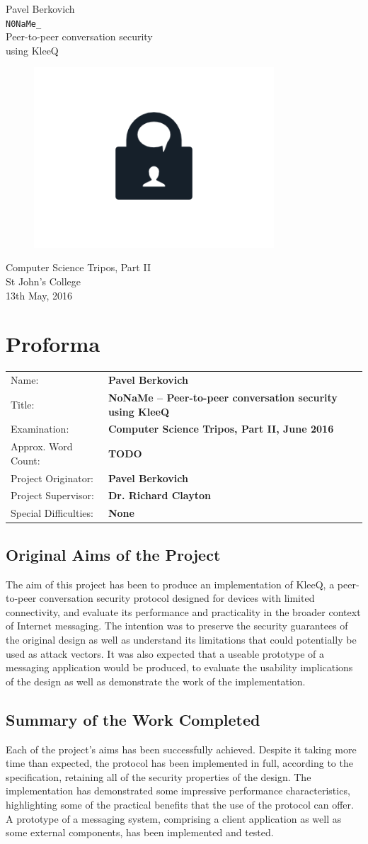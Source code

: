 \documentclass[a4paper, 12pt]{report}
\newcommand*{\titleTH}{ %
\begingroup
\raggedleft
\thispagestyle{empty}
{\Large Pavel Berkovich}\\[0.167\textheight] \centering
{\huge \texttt{N0NaMe\_}}\\[\baselineskip]
{\Large Peer-to-peer conversation security \\ using KleeQ} \\
\begin{figure}[h]
    \centering
    \includegraphics[width = 0.8\textwidth]{lock_chat.png} 
\end{figure}
{\large Computer Science Tripos, Part II}\\ \vspace{3mm}
{\large St John's College} \\ \vspace{3mm}
{\large 13th May, 2016}
\vfill
\clearpage
\endgroup}
\begin{document}
\titleTH


\chapter*{Proforma}
\begin{tabular}{l >{\bfseries}l}
    Name: & Pavel Berkovich \\
    Title: & NoNaMe -- Peer-to-peer conversation security using KleeQ \\
    Examination: & Computer Science Tripos, Part II, June 2016 \\
    Approx. Word Count: & {\color{red} TODO} \\
    Project Originator: & Pavel Berkovich \\
    Project Supervisor: & Dr. Richard Clayton \\
    Special Difficulties: & None
\end{tabular}

\section*{Original Aims of the Project}
The aim of this project has been to produce an implementation of KleeQ, a peer-to-peer conversation security protocol designed for devices with limited connectivity, and evaluate its performance and practicality in the broader context of Internet messaging. The intention was to preserve the security guarantees of the original design as well as understand its limitations that could potentially be used as attack vectors. It was also expected that a useable prototype of a messaging application would be produced, to evaluate the usability implications of the design as well as demonstrate the work of the implementation.

\section*{Summary of the Work Completed}
{\color{red} 
Each of the project's aims has been successfully achieved. Despite it taking more time than expected, the protocol has been implemented in full, according to the specification, retaining all of the security properties of the design. The implementation has demonstrated some impressive performance characteristics, highlighting some of the practical benefits that the use of the protocol can offer. A prototype of a messaging system, comprising a client application as well as some external components, has been implemented and tested.}
\end{document}
